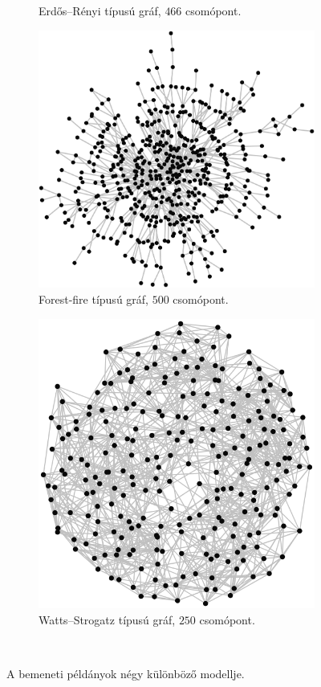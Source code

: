 \begin{figure}[ht]
\begin{subfigure}[b]{0.5\linewidth}
    \caption{ Erdős–Rényi típusú gráf, $466$ csomópont. }
    \label{fig:ERDOS_RENYI_MODEL}
    \vspace{4ex}
  \end{subfigure}
  \begin{subfigure}[b]{0.5\linewidth}
    \centering
    \includegraphics[width=1.15\linewidth]{images/forest_fire_model.png}
    \caption{ Forest-fire típusú gráf, $500$ csomópont. }
    \label{fig:FOREST_FIRE_MODEL}
  \end{subfigure}%
  \begin{subfigure}[b]{0.5\linewidth}
    \centering
    \includegraphics[width=0.85\linewidth]{images/watts_strogatz_model.png}
    \caption{ Watts–Strogatz típusú gráf, $250$ csomópont. }
    \label{fig:WATTS_STROGATZ_MODEL}
  \end{subfigure}\\
  \caption{A bemeneti példányok négy különböző modellje.}
  \label{fig:BENCHMARK_INSTANCES}
\end{figure}
